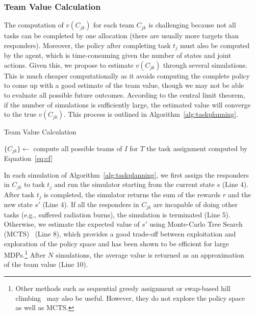 \subsubsection{Team Value Calculation}
\noindent The computation of  $v(C_{jk})$ for each team
$C_{jk}$ is challenging because not all tasks can be completed by
one allocation (there are usually more targets than responders). Moreover, the policy after completing task $t_j$ must also be computed by the agent, which is time-consuming given the number of states and joint
actions. Given this, we propose to estimate $v(C_{jk})$ through
several simulations. This is much cheaper computationally as it avoids computing the complete policy to come up
with a good estimate of the team value, though we may not be able to
evaluate all possible future outcomes. According to the central
limit theorem, if the number of simulations is sufficiently
large, the estimated value will converge to the true $v(C_{jk})$.
This process is outlined in Algorithm~\ref{alg:taskplanning}.
\begin{algorithm}[htbp]\small
  \caption{Team Value Calculation}
  \label{alg:taskplanning}
  \Indm
  \Indp\BlankLine
  $\{ C_{jk} \} \gets$ compute all possible teams of $I$ for
  $T$ \;
  \Return the task assignment computed by Equation~\ref{eq:cf}
\end{algorithm}

In each simulation of Algorithm~\ref{alg:taskplanning}, we first
assign the responders in $C_{jk}$ to task $t_j$ and run the
simulator starting from the current state $s$ (Line 4). After task
$t_j$ is completed, the simulator returns the sum of the rewards
$r$ and the new state $s'$ (Line 4). If all the responders in
$C_{jk}$ are incapable of doing other tasks (e.g., suffered
radiation burns), the simulation is terminated (Line
5). Otherwise, we estimate the expected value of $s'$ using
Monte-Carlo Tree Search (MCTS)~\cite{kocsis2006bandit} (Line 8),
which provides a good trade-off between exploitation and exploration
of the policy space and has been shown to be efficient for large
MDPs.\footnote{Other methods such as sequential greedy assignment
or swap-based hill climbing~\cite{proper2009solving} may also be useful. However, they do not explore the policy space as well as MCTS.} After $N$ simulations, the average value is returned as an approximation of
the team value (Line 10).

